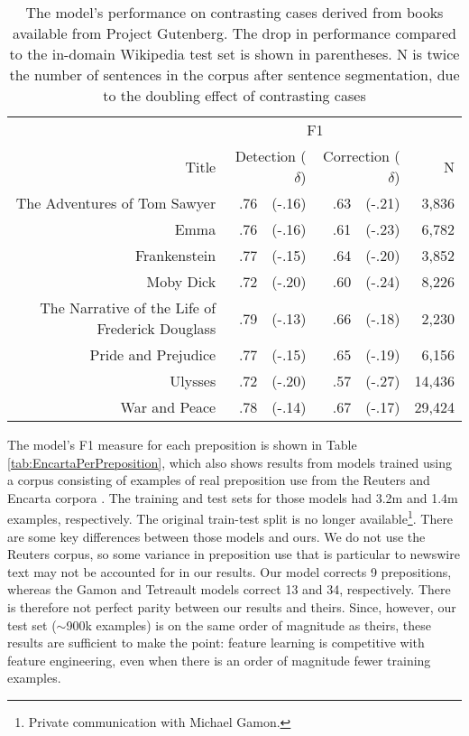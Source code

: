 \begin{table*}
\centering
\begin{tabular}{rrrr}
 & \multicolumn{2}{c}{F1} &  \\
 \cline{2-3}
Title & Detection ($\delta$) & Correction ($\delta$) & N \\
\midrule
The Adventures of Tom Sawyer                    & .76~~(-.16) & .63~~(-.21) &  3,836 \\
Emma                                            & .76~~(-.16) & .61~~(-.23) &  6,782 \\
Frankenstein                                    & .77~~(-.15) & .64~~(-.20) &  3,852 \\
Moby Dick                                       & .72~~(-.20) & .60~~(-.24) &  8,226 \\
The Narrative of the Life of Frederick Douglass & .79~~(-.13) & .66~~(-.18) &  2,230 \\
Pride and Prejudice                             & .77~~(-.15) & .65~~(-.19) &  6,156 \\
Ulysses                                         & .72~~(-.20) & .57~~(-.27) & 14,436 \\
War and Peace                                   & .78~~(-.14) & .67~~(-.17) & 29,424 \\
\end{tabular}
\caption{The model's performance on contrasting cases derived from books available from Project Gutenberg.  The drop in performance compared to the in-domain Wikipedia test set is shown in parentheses.  N is twice the number of sentences in the corpus after sentence segmentation, due to the doubling effect of contrasting cases}
\label{tab:Books}
\end{table*}

The model's F1 measure for each preposition is shown in Table \ref{tab:EncartaPerPreposition}, which also shows results from models trained using a corpus consisting of examples of real preposition use from the Reuters and Encarta corpora \cite{gamon2008using,tetreault2008native}.  The training and test sets for those models had 3.2m and 1.4m examples, respectively.  The original train-test split is no longer available\footnote{Private communication with Michael Gamon.}.  There are some key differences between those models and ours.  We do not use the Reuters corpus, so some variance in preposition use that is particular to newswire text may not be accounted for in our results.  Our model corrects 9 prepositions, whereas the Gamon and Tetreault models correct 13 and 34, respectively.  There is therefore not perfect parity between our results and theirs.  Since, however, our test set ($\sim$900k examples) is on the same order of magnitude as theirs, these results are sufficient to make the point: feature learning is competitive with feature engineering, even when there is an order of magnitude fewer training examples.

